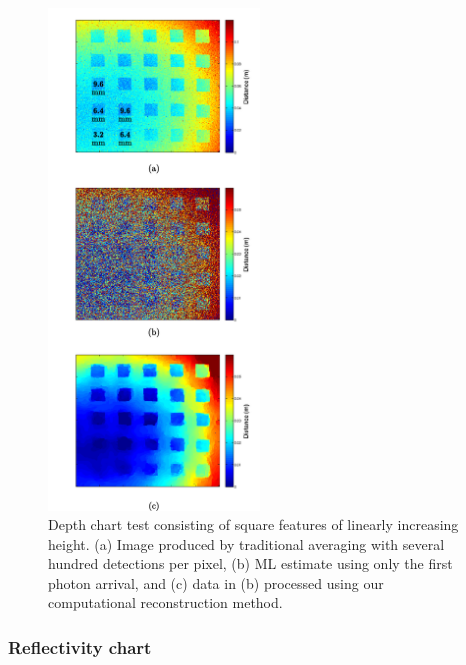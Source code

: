 \begin{figure}[h!]
\centering
\includegraphics[width=0.5\textwidth]{figure-first-depthchart.pdf}
\caption{Depth chart test consisting of square features of linearly increasing height. (a) Image produced by traditional averaging with several hundred detections per pixel, (b) ML estimate using only the first photon arrival, and (c) data in (b) processed using our computational reconstruction method.}
\label{figure:first-depthchart}
\end{figure}

\subsubsection{Reflectivity chart}

